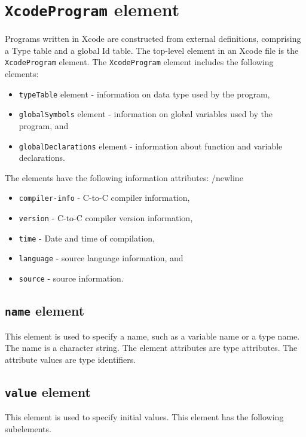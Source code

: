 \section{ {\tt XcodeProgram} element}

Programs written in Xcode are constructed from external definitions, comprising a Type table and a global Id table. The top-level element in an Xcode file is the {\tt XcodeProgram} element. The {\tt XcodeProgram} element includes the following elements:

\begin{itemize}
\item {\tt typeTable} element - information on data type used by the program,
\item {\tt globalSymbols} element - information on global variables used by the program, and
\item {\tt globalDeclarations} element - information about function and variable declarations.
\end{itemize}

The elements have the following information attributes:
/newline

\begin{itemize}
\item {\tt compiler-info} - C-to-C compiler information,
\item {\tt version} - C-to-C compiler version information,
\item {\tt time} - Date and time of compilation,
\item {\tt language} - source language information, and
\item {\tt source} - source information.
\end{itemize}


\subsection{ {\tt name} element}

This element is used to specify a name, such as a variable name or a type name. The name is a character string. The element attributes are type attributes. The attribute values are type identifiers.


\subsection{ {\tt value} element}

This element is used to specify initial values. This element has the following subelements.

